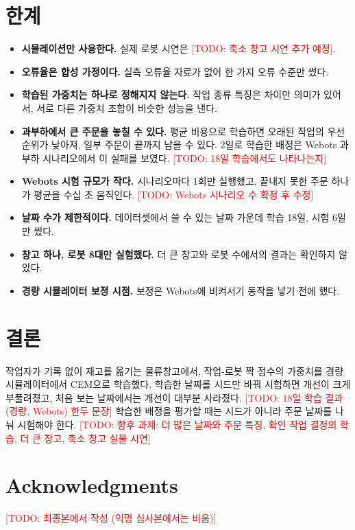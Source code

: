 \documentclass[conference]{IEEEtran}
\newcommand{\todo}[1]{\textcolor{red}{[TODO: #1]}}
\begin{document}
\section{한계}
\begin{itemize}
  \item \textbf{시뮬레이션만 사용한다.} 실제 로봇 시연은 \todo{축소 창고 시연 추가 예정}.
  \item \textbf{오류율은 합성 가정이다.} 실측 오류율 자료가 없어 한 가지 오류 수준만 썼다.
  \item \textbf{학습된 가중치는 하나로 정해지지 않는다.} 작업 종류 특징은 차이만 의미가 있어서, 서로 다른 가중치 조합이 비슷한 성능을 낸다.
  \item \textbf{과부하에서 큰 주문을 놓칠 수 있다.} 평균 비용으로 학습하면 오래된 작업의 우선순위가 낮아져, 일부 주문이 끝까지 남을 수 있다. 2일로 학습한 배정은 Webots 과부하 시나리오에서 이 실패를 보였다. \todo{18일 학습에서도 나타나는지}
  \item \textbf{Webots 시험 규모가 작다.} 시나리오마다 1회만 실행했고, 끝내지 못한 주문 하나가 평균을 수십 초 움직인다. \todo{Webots 시나리오 수 확정 후 수정}
  \item \textbf{날짜 수가 제한적이다.} 데이터셋에서 쓸 수 있는 날짜 가운데 학습 18일, 시험 6일만 썼다.
  \item \textbf{창고 하나, 로봇 8대만 실험했다.} 더 큰 창고와 로봇 수에서의 결과는 확인하지 않았다.
  \item \textbf{경량 시뮬레이터 보정 시점.} 보정은 Webots에 비켜서기 동작을 넣기 전에 했다.
\end{itemize}

\section{결론}
\label{sec:conclusion}
작업자가 기록 없이 재고를 옮기는 물류창고에서, 작업-로봇 짝 점수의 가중치를 경량 시뮬레이터에서 CEM으로 학습했다.
학습한 날짜를 시드만 바꿔 시험하면 개선이 크게 부풀려졌고, 처음 보는 날짜에서는 개선이 대부분 사라졌다.
\todo{18일 학습 결과(경량, Webots) 한두 문장}
학습한 배정을 평가할 때는 시드가 아니라 주문 날짜를 나눠 시험해야 한다.
\todo{향후 과제: 더 많은 날짜와 주문 특징, 확인 작업 결정의 학습, 더 큰 창고, 축소 창고 실물 시연}

\section*{Acknowledgments}
\todo{최종본에서 작성 (익명 심사본에서는 비움)}



\end{document}
